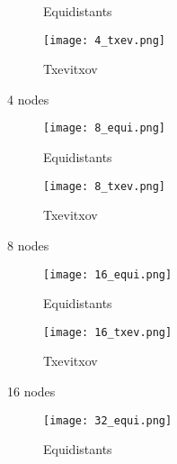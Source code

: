 \documentclass[a4paper, 12pt]{article}
\begin{document}
\begin{exercici}
\begin{enumerate}[label=\alph*)]
\begin{solucio}
\begin{figure}[H]
\begin{subfigure}{0.5\textwidth}
                        \caption{Equidistants}
                    \end{subfigure}
                    \begin{subfigure}{0.5\textwidth}
                        \centering
                        \texttt{[image: 4\_txev.png]}
                        \caption{Txevitxov}
                    \end{subfigure}
                    \caption{4 nodes}
                \end{figure}
                \begin{figure}[H]
                    \begin{subfigure}{0.5\textwidth}
                        \centering
                        \texttt{[image: 8\_equi.png]}
                        \caption{Equidistants}
                    \end{subfigure}
                    \begin{subfigure}{0.5\textwidth}
                        \centering
                        \texttt{[image: 8\_txev.png]}
                        \caption{Txevitxov}
                    \end{subfigure}
                    \caption{8 nodes}
                \end{figure}
                \begin{figure}[H]
                    \begin{subfigure}{0.5\textwidth}
                        \centering
                        \texttt{[image: 16\_equi.png]}
                        \caption{Equidistants}
                    \end{subfigure}
                    \begin{subfigure}{0.5\textwidth}
                        \centering
                        \texttt{[image: 16\_txev.png]}
                        \caption{Txevitxov}
                    \end{subfigure}
                    \caption{16 nodes}
                \end{figure}
                \begin{figure}[H]
                    \begin{subfigure}{0.5\textwidth}
                        \centering
                        \texttt{[image: 32\_equi.png]}
                        \caption{Equidistants}
                    \end{subfigure}
                    \begin{subfigure}{0.5\textwidth}

\end{subfigure}
\end{figure}
\end{solucio}
\end{enumerate}
\end{exercici}
\end{document}
